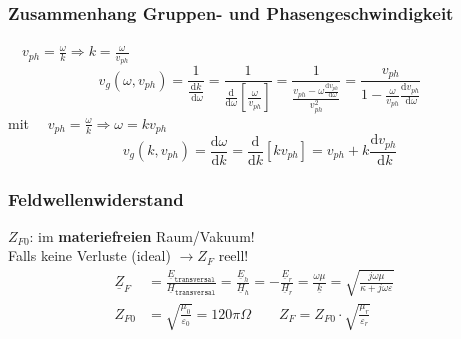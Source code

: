\subsubsection{Zusammenhang Gruppen- und Phasengeschwindigkeit}
$\quad v_{p h}=\frac{\omega}{k} \Rightarrow k=\frac{\omega}{v_{p h}}$
$$
v_g\left(\omega, v_{p h}\right)=\frac{1}{\frac{\mathrm{d} k}{\mathrm{~d} \omega}}=\frac{1}{\frac{\mathrm{d}}{\mathrm{d} \omega}\left[\frac{\omega}{v_{p h}}\right]}=\frac{1}{\frac{v_{p h}-\omega \frac{\mathrm{d} v_{p h}}{\mathrm{~d} \omega}}{v_{p h}^2}}=\frac{v_{p h}}{1-\frac{\omega}{v_{p h}} \frac{\mathrm{d} v_{p h}}{\mathrm{~d} \omega}}
$$
mit $\quad v_{p h}=\frac{\omega}{k} \Rightarrow \omega=k v_{p h}$
$$
v_g\left(k, v_{p h}\right)=\frac{\mathrm{d} \omega}{\mathrm{d} k}=\frac{\mathrm{d}}{\mathrm{d} k}\left[k v_{p h}\right]=v_{p h}+k \frac{\mathrm{d} v_{p h}}{\mathrm{~d} k}
$$

\subsubsection{Feldwellenwiderstand}
$ Z_{F0} $: im \textbf{materiefreien} Raum/Vakuum!\\
Falls keine Verluste (ideal) $ \rightarrow Z_F $ reell!
\begin{align*}
	\underline{Z}_F &= \frac{\underline{E}_{\texttt{transversal}}}{\underline{H}_{\texttt{transversal}}} = \frac{\underline{E}_h}{\underline{H}_h} = -\frac{\underline{E}_r}{\underline{H}_r} = \frac{\omega \mu}{\underline{k}} = \sqrt{\frac{j\omega\mu}{\kappa+j \omega \varepsilon}}\\
	Z_{F0} &= \sqrt{\frac{\mu_0}{\varepsilon_0}} = 120\pi \Omega \qquad  Z_F = Z_{F0} \cdot \sqrt{\frac{\mu_r}{\varepsilon_r}} &
\end{align*}
